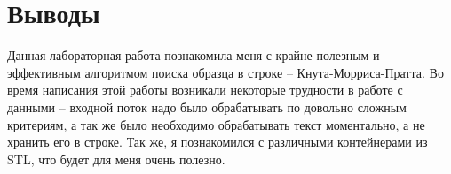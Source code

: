 \section{Выводы}
Данная лабораторная работа познакомила меня с крайне полезным и эффективным алгоритмом поиска образца в строке -- Кнута-Морриса-Пратта. Во время написания этой работы возникали некоторые трудности в работе с данными -- входной поток надо было обрабатывать по довольно сложным критериям, а так же было необходимо обрабатывать текст моментально, а не хранить его в строке. Так же, я познакомился с различными контейнерами из STL, что будет для меня очень полезно.
\pagebreak